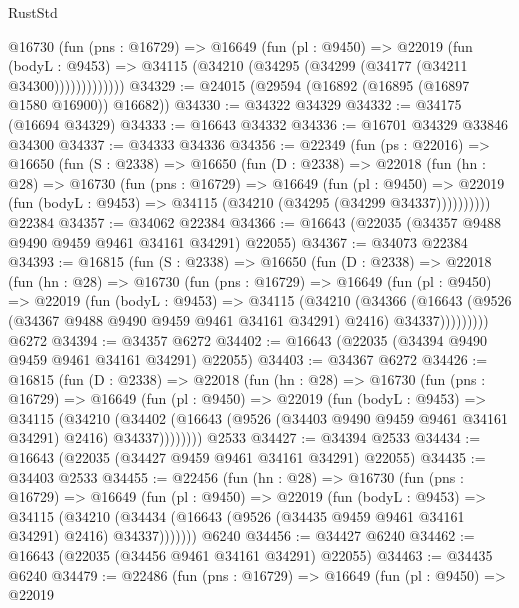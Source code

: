 \begin{lexlean}{RustStd}
\begin{coremodule}
            @16730
              (fun (pns : @16729) =>
              @16649
                (fun (pl : @9450) =>
                @22019
                  (fun (bodyL : @9453) =>
                  @34115 (@34210 (@34295 (@34299 (@34177 (@34211 @34300)))))))))))))
@34329 := @24015 (@29594 (@16892 (@16895 (@16897 @1580 @16900)) @16682))
@34330 := @34322 @34329
@34332 := @34175 (@16694 @34329)
@34333 := @16643 @34332
@34336 := @16701 @34329 @33846 @34300
@34337 := @34333 @34336
@34356 := @22349
    (fun (ps : @22016) =>
    @16650
      (fun (S : @2338) =>
      @16650
        (fun (D : @2338) =>
        @22018
          (fun (hn : @28) =>
          @16730
            (fun (pns : @16729) =>
            @16649
              (fun (pl : @9450) =>
              @22019 (fun (bodyL : @9453) => @34115 (@34210 (@34295 (@34299 @34337))))))))))
    @22384
@34357 := @34062 @22384
@34366 := @16643 (@22035 (@34357 @9488 @9490 @9459 @9461 @34161 @34291) @22055)
@34367 := @34073 @22384
@34393 := @16815
    (fun (S : @2338) =>
    @16650
      (fun (D : @2338) =>
      @22018
        (fun (hn : @28) =>
        @16730
          (fun (pns : @16729) =>
          @16649
            (fun (pl : @9450) =>
            @22019
              (fun (bodyL : @9453) =>
              @34115
                (@34210
                  (@34366
                    (@16643
                      (@9526 (@34367 @9488 @9490 @9459 @9461 @34161 @34291) @2416)
                      @34337)))))))))
    @6272
@34394 := @34357 @6272
@34402 := @16643 (@22035 (@34394 @9490 @9459 @9461 @34161 @34291) @22055)
@34403 := @34367 @6272
@34426 := @16815
    (fun (D : @2338) =>
    @22018
      (fun (hn : @28) =>
      @16730
        (fun (pns : @16729) =>
        @16649
          (fun (pl : @9450) =>
          @22019
            (fun (bodyL : @9453) =>
            @34115
              (@34210
                (@34402
                  (@16643 (@9526 (@34403 @9490 @9459 @9461 @34161 @34291) @2416) @34337))))))))
    @2533
@34427 := @34394 @2533
@34434 := @16643 (@22035 (@34427 @9459 @9461 @34161 @34291) @22055)
@34435 := @34403 @2533
@34455 := @22456
    (fun (hn : @28) =>
    @16730
      (fun (pns : @16729) =>
      @16649
        (fun (pl : @9450) =>
        @22019
          (fun (bodyL : @9453) =>
          @34115
            (@34210 (@34434 (@16643 (@9526 (@34435 @9459 @9461 @34161 @34291) @2416) @34337)))))))
    @6240
@34456 := @34427 @6240
@34462 := @16643 (@22035 (@34456 @9461 @34161 @34291) @22055)
@34463 := @34435 @6240
@34479 := @22486
    (fun (pns : @16729) =>
    @16649
      (fun (pl : @9450) =>
      @22019

\end{coremodule}
\end{lexlean}
